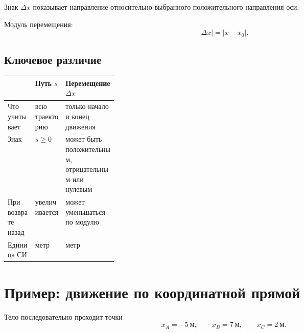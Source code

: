 \documentclass[a4paper,12pt]{article}
\begin{document}
Знак \(\Delta x\) показывает направление относительно выбранного положительного направления оси.

Модуль перемещения:
\[
|\Delta x|=|x-x_0|.
\]

\subsection{Ключевое различие}

\begin{center}
\renewcommand{\arraystretch}{1.35}
\begin{tabularx}{\linewidth}{@{}p{0.25\linewidth}XX@{}}
\toprule
& \textbf{Путь \(s\)} & \textbf{Перемещение \(\Delta x\)} \\
\midrule
Что учитывает &
всю траекторию &
только начало и конец движения \\

Знак &
\(s\ge 0\) &
может быть положительным, отрицательным или нулевым \\

При возврате назад &
увеличивается &
может уменьшаться по модулю \\

Единица СИ &
метр &
метр \\
\bottomrule
\end{tabularx}
\end{center}

\section{Пример: движение по координатной прямой}

Тело последовательно проходит точки
\[
x_A=-5~\text{м},\qquad
x_B=7~\text{м},\qquad
x_C=2~\text{м}.
\]

\begin{center}
\end{center}
\end{document}

